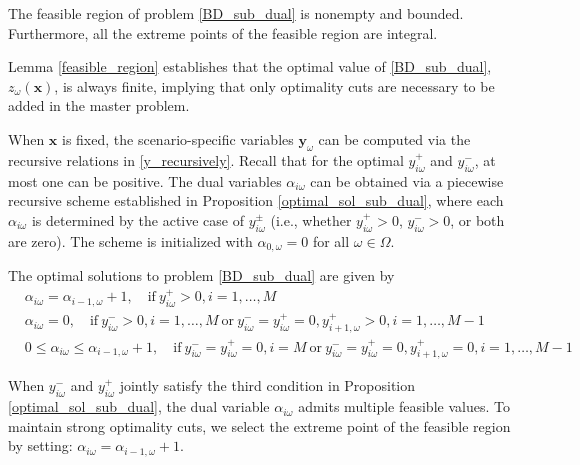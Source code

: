 \begin{lem}\label{feasible_region}
  The feasible region of problem \eqref{BD_sub_dual} is nonempty and bounded. Furthermore, all the extreme points of the feasible region are integral.
 \end{lem}
 
Lemma \ref{feasible_region} establishes that the optimal value of \eqref{BD_sub_dual}, $z_{\omega}(\mathbf{x})$, is always finite, implying that only optimality cuts are necessary to be added in the master problem.

When $\mathbf{x}$ is fixed, the scenario-specific variables $\mathbf{y}_{\omega}$ can be computed via the recursive relations in \eqref{y_recursively}. Recall that for the optimal $y_{i \omega}^{+}$ and $y_{i \omega}^{-}$, at most one can be positive. The dual variables $\alpha_{i \omega}$ can be obtained via a piecewise recursive scheme established in Proposition \ref{optimal_sol_sub_dual}, where each $\alpha_{i \omega}$ is determined by the active case of $y_{i \omega}^{\pm}$ (i.e., whether $y_{i \omega}^{+}>0$, $y_{i \omega}^{-}>0$, or both are zero). The scheme is initialized with $\alpha_{0, \omega} = 0$ for all $\omega \in \Omega$.
 

 \begin{prop}\label{optimal_sol_sub_dual}
   The optimal solutions to problem \eqref{BD_sub_dual} are given by 
 \begin{equation}\label{BD_sub_simplified}
   \begin{aligned}
    & \alpha_{i \omega} = \alpha_{i-1, \omega}+1, \quad  \text{if}~ y_{i \omega}^{+} > 0, i =1,\ldots, M \\
     & \alpha_{i \omega} = 0, \quad  \text{if}~  y_{i \omega}^{-} > 0,  i =1,\ldots, M~\text{or}~ y_{i \omega}^{-} = y_{i \omega}^{+} = 0, y_{i+1, \omega}^{+}> 0, i = 1,\ldots, M-1 \\
     & 0 \leq \alpha_{i \omega} \leq \alpha_{i-1, \omega}+1, \quad  \text{if}~ y_{i \omega}^{-} = y_{i \omega}^{+} = 0, i = M~\text{or}~ y_{i \omega}^{-} = y_{i \omega}^{+} = 0, y_{i+1, \omega}^{+}= 0, i = 1,\ldots, M-1
   \end{aligned}
 \end{equation}
 \end{prop}


When $y_{i \omega}^{-}$ and $y_{i \omega}^{+}$ jointly satisfy the third condition in Proposition \ref{optimal_sol_sub_dual}, the dual variable $\alpha_{i \omega}$ admits multiple feasible values. To maintain strong optimality cuts, we select the extreme point of the feasible region by setting: $\alpha_{i \omega} = \alpha_{i-1, \omega}+1$.


